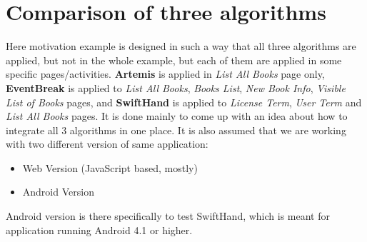 \documentclass[authoryear,preprint, twocolumn]{sigplanconf}
\begin{document}
\section{Comparison of three algorithms}
\label{sec:comparison}

Here motivation example is designed in such a way that all three algorithms are applied, but not in the whole example, but each of them are applied in some specific pages/activities. \textbf{Artemis} is applied in \emph{List All Books} page only, \textbf{EventBreak} is applied to \emph{List All Books}, \emph{Books List}, \emph{New Book Info}, \emph{Visible List of Books} pages, and \textbf{SwiftHand} is applied to \emph{License Term}, \emph{User Term} and \emph{List All Books} pages. It is done mainly to come up with an idea about how to integrate all 3 algorithms in one place. It is also assumed that we are working with two different version of same application: 
\begin{itemize}
	\item Web Version (JavaScript based, mostly)
	\item Android Version 
\end{itemize}
Android version is there specifically to test SwiftHand, which is meant for application running Android 4.1 or higher.
\end{document}
